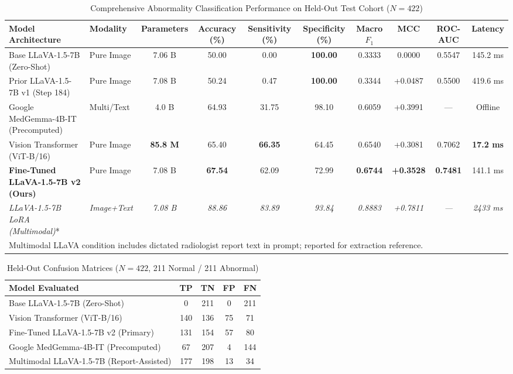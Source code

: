 
\begin{table}[t]
\centering
\caption{Comprehensive Abnormality Classification Performance on Held-Out Test Cohort ($N = 422$)}
\label{tab:benchmark_comparison}
\begin{tabular}{llcccccccc}
\toprule
\textbf{Model Architecture} & \textbf{Modality} & \textbf{Parameters} & \textbf{Accuracy (\%)} & \textbf{Sensitivity (\%)} & \textbf{Specificity (\%)} & \textbf{Macro $F_1$} & \textbf{MCC} & \textbf{ROC-AUC} & \textbf{Latency} \\
\midrule
Base LLaVA-1.5-7B (Zero-Shot) & Pure Image & 7.06 B & 50.00 & 0.00 & \textbf{100.00} & 0.3333 & 0.0000 & 0.5547 & 145.2 ms \\
Prior LLaVA-1.5-7B v1 (Step 184) & Pure Image & 7.08 B & 50.24 & 0.47 & \textbf{100.00} & 0.3344 & +0.0487 & 0.5500 & 419.6 ms \\
Google MedGemma-4B-IT (Precomputed) & Multi/Text & 4.0 B & 64.93 & 31.75 & 98.10 & 0.6059 & +0.3991 & --- & Offline \\
Vision Transformer (ViT-B/16) & Pure Image & \textbf{85.8 M} & 65.40 & \textbf{66.35} & 64.45 & 0.6540 & +0.3081 & 0.7062 & \textbf{17.2 ms} \\
\textbf{Fine-Tuned LLaVA-1.5-7B v2 (Ours)} & Pure Image & 7.08 B & \textbf{67.54} & 62.09 & 72.99 & \textbf{0.6744} & \textbf{+0.3528} & \textbf{0.7481} & 141.1 ms \\
\midrule
\textit{LLaVA-1.5-7B LoRA (Multimodal)}* & \textit{Image+Text} & \textit{7.08 B} & \textit{88.86} & \textit{83.89} & \textit{93.84} & \textit{0.8883} & \textit{+0.7811} & \textit{---} & \textit{2433 ms} \\
\bottomrule
\multicolumn{10}{l}{\footnotesize *Multimodal LLaVA condition includes dictated radiologist report text in prompt; reported for extraction reference.}
\end{tabular}
\end{table}

\begin{table}[ht]
\centering
\caption{Held-Out Confusion Matrices ($N = 422$, 211 Normal / 211 Abnormal)}
\label{tab:confusion_matrices}
\begin{tabular}{lcccc}
\toprule
\textbf{Model Evaluated} & \textbf{TP} & \textbf{TN} & \textbf{FP} & \textbf{FN} \\
\midrule
Base LLaVA-1.5-7B (Zero-Shot) & 0 & 211 & 0 & 211 \\
Vision Transformer (ViT-B/16) & 140 & 136 & 75 & 71 \\
Fine-Tuned LLaVA-1.5-7B v2 (Primary) & 131 & 154 & 57 & 80 \\
Google MedGemma-4B-IT (Precomputed) & 67 & 207 & 4 & 144 \\
Multimodal LLaVA-1.5-7B (Report-Assisted) & 177 & 198 & 13 & 34 \\
\bottomrule
\end{tabular}
\end{table}

